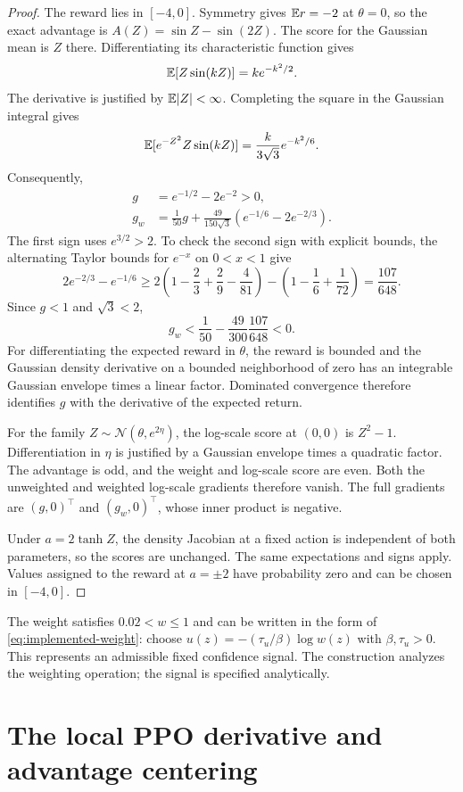 \begin{proof}
The reward lies in $[-4,0]$. Symmetry gives $\mathbb{E} r=-2$ at $\theta=0$, so the exact advantage is $A(Z)=\sin Z-\sin(2Z)$. The score for the Gaussian mean is $Z$ there. Differentiating its characteristic function gives
\[
\mathbb{E}[Z\sin(kZ)]=ke^{-k^2/2}.
\]
The derivative is justified by $\mathbb{E}|Z|<\infty$. Completing the square in the Gaussian integral gives
\[
\mathbb{E}[e^{-Z^2}Z\sin(kZ)]
=\frac{k}{3\sqrt3}e^{-k^2/6}.
\]
Consequently,
\begin{align}
g&=e^{-1/2}-2e^{-2}>0,\\
g_w&=\frac1{50}g+
\frac{49}{150\sqrt3}\left(e^{-1/6}-2e^{-2/3}\right).
\label{eq:gaussian-gradient}
\end{align}
The first sign uses $e^{3/2}>2$. To check the second sign with explicit bounds, the alternating Taylor bounds for $e^{-x}$ on $0<x<1$ give
\[
2e^{-2/3}-e^{-1/6}
\ge 2\left(1-\frac23+\frac29-\frac4{81}\right)
-\left(1-\frac16+\frac1{72}\right)
=\frac{107}{648}.
\]
Since $g<1$ and $\sqrt3<2$,
\[
g_w<\frac1{50}-\frac{49}{300}\frac{107}{648}<0.
\]
For differentiating the expected reward in $\theta$, the reward is bounded and the Gaussian density derivative on a bounded neighborhood of zero has an integrable Gaussian envelope times a linear factor. Dominated convergence therefore identifies $g$ with the derivative of the expected return.

For the family $Z\sim\mathcal N(\theta,e^{2\eta})$, the log-scale score at $(0,0)$ is $Z^2-1$. Differentiation in $\eta$ is justified by a Gaussian envelope times a quadratic factor. The advantage is odd, and the weight and log-scale score are even. Both the unweighted and weighted log-scale gradients therefore vanish. The full gradients are $(g,0)^\top$ and $(g_w,0)^\top$, whose inner product is negative.

Under $a=2\tanh Z$, the density Jacobian at a fixed action is independent of both parameters, so the scores are unchanged. The same expectations and signs apply. Values assigned to the reward at $a=\pm2$ have probability zero and can be chosen in $[-4,0]$.
\end{proof}

The weight satisfies $0.02<w\le1$ and can be written in the form of \eqref{eq:implemented-weight}: choose $u(z)=-(\tau_u/\beta)\log w(z)$ with $\beta,\tau_u>0$. This represents an admissible fixed confidence signal. The construction analyzes the weighting operation; the signal is specified analytically.

\section{The local PPO derivative and advantage centering}
\label{app:ppo}

